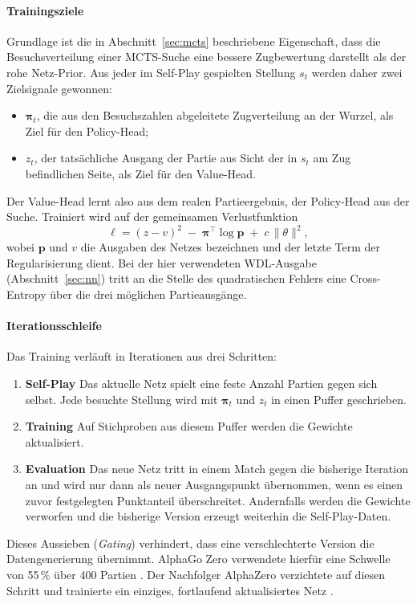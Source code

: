 \documentclass[
  a4paper, 12pt,
  parskip=half,
  headings=small,
  bibliography=totoc
]{scrartcl}
\begin{document}
\paragraph{Trainingsziele}
Grundlage ist die in Abschnitt~\ref{sec:mcts} beschriebene Eigenschaft, dass die Besuchsverteilung einer MCTS-Suche eine bessere Zugbewertung darstellt als der rohe Netz-Prior. Aus jeder im Self-Play gespielten Stellung \(s_t\) werden daher zwei Zielsignale gewonnen:
\begin{itemize}
  \item \(\boldsymbol{\pi}_t\), die aus den Besuchszahlen abgeleitete
        Zugverteilung an der Wurzel, als Ziel für den Policy-Head;
  \item \(z_t\), der tatsächliche Ausgang der Partie aus Sicht der in \(s_t\) am
        Zug befindlichen Seite, als Ziel für den Value-Head.
\end{itemize}
Der Value-Head lernt also aus dem realen Partieergebnis, der Policy-Head aus der Suche. Trainiert wird auf der gemeinsamen Verlustfunktion
\[
  \ell = (z - v)^2 \;-\; \boldsymbol{\pi}^{\top} \log \mathbf{p}
         \;+\; c\,\lVert\theta\rVert^2 ,
\]
wobei \(\mathbf{p}\) und \(v\) die Ausgaben des Netzes bezeichnen und der letzte Term der Regularisierung dient. Bei der hier verwendeten WDL-Ausgabe (Abschnitt~\ref{sec:nn}) tritt an die Stelle des quadratischen Fehlers eine Cross-Entropy über die drei möglichen Partieausgänge.

\paragraph{Iterationsschleife}
Das Training verläuft in Iterationen aus drei Schritten:
\begin{enumerate}
  \item \textbf{Self-Play} Das aktuelle Netz spielt eine feste Anzahl Partien
        gegen sich selbst. Jede besuchte Stellung wird mit \(\boldsymbol{\pi}_t\)
        und \(z_t\) in einen Puffer geschrieben.
  \item \textbf{Training} Auf Stichproben aus diesem Puffer werden die Gewichte
        aktualisiert.
  \item \textbf{Evaluation} Das neue Netz tritt in einem Match gegen die
        bisherige Iteration an und wird nur dann als neuer Ausgangspunkt
        übernommen, wenn es einen zuvor festgelegten Punktanteil überschreitet.
        Andernfalls werden die Gewichte verworfen und die bisherige Version
        erzeugt weiterhin die Self-Play-Daten.
\end{enumerate}
Dieses Aussieben (\emph{Gating}) verhindert, dass eine verschlechterte Version die Datengenerierung übernimmt. AlphaGo Zero verwendete hierfür eine Schwelle von 55\,\% über 400 Partien \parencite{silver2017mastering}. Der Nachfolger AlphaZero verzichtete auf diesen Schritt und trainierte ein einziges, fortlaufend aktualisiertes Netz \parencite{silver2018}.
\end{document}
